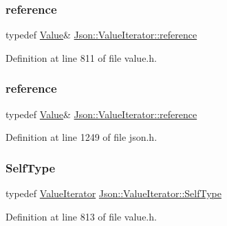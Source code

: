 \subsubsection{\texorpdfstring{reference}{reference}\hspace{0.1cm}{\footnotesize\ttfamily [1/2]}}
{\footnotesize\ttfamily typedef \hyperlink{class_json_1_1_value}{Value}\& \hyperlink{class_json_1_1_value_iterator_ae87929b4567aa00372cf602c43b57160}{Json\+::\+Value\+Iterator\+::reference}}



Definition at line 811 of file value.\+h.

\hypertarget{class_json_1_1_value_iterator_ae87929b4567aa00372cf602c43b57160}{}\label{class_json_1_1_value_iterator_ae87929b4567aa00372cf602c43b57160} 
\subsubsection{\texorpdfstring{reference}{reference}\hspace{0.1cm}{\footnotesize\ttfamily [2/2]}}
{\footnotesize\ttfamily typedef \hyperlink{class_json_1_1_value}{Value}\& \hyperlink{class_json_1_1_value_iterator_ae87929b4567aa00372cf602c43b57160}{Json\+::\+Value\+Iterator\+::reference}}



Definition at line 1249 of file json.\+h.

\hypertarget{class_json_1_1_value_iterator_a23357670fdad61792670d86f62db7e16}{}\label{class_json_1_1_value_iterator_a23357670fdad61792670d86f62db7e16} 
\subsubsection{\texorpdfstring{Self\+Type}{SelfType}\hspace{0.1cm}{\footnotesize\ttfamily [1/2]}}
{\footnotesize\ttfamily typedef \hyperlink{class_json_1_1_value_iterator}{Value\+Iterator} \hyperlink{class_json_1_1_value_iterator_a23357670fdad61792670d86f62db7e16}{Json\+::\+Value\+Iterator\+::\+Self\+Type}}



Definition at line 813 of file value.\+h.

